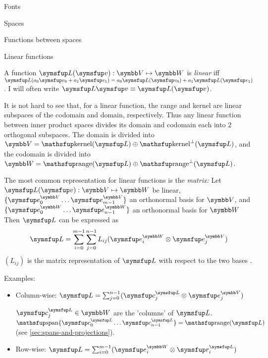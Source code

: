 \documentclass[12pt]{PalisadesLakesArticle}
\begin{document}
\begin{plSection}{Fonts}
\begin{plSection}{Spaces}
\begin{plSection}{Functions between spaces}
\begin{plSection}{Linear functions}
\label{sec:linear-functions}

A function $\Vector{L}(\Vector{v}):\Space{V} \mapsto \Space{W}$
is \textit{linear} iff
$\Vector{L}(a_0 \Vector{v}_0 + a_1 \Vector{v}_1) 
= a_0 \Vector{L}(\Vector{v}_0) + a_1 \Vector{L}(\Vector{v}_1)$.
I will often write
 $\Vector{L}\Vector{v} \equiv \Vector{L}(\Vector{v})$.

It is not hard to see that, for a linear function,
the range and kernel are linear subspaces of the codomain and
domain, respectively.
Thus any linear function between inner product spaces
divides its domain and codomain each into 2 orthogonal subspaces.
The domain is divided into 
$\Space{V} = \kernel(\Vector{L}) \oplus \kernel^{\perp}(\Vector{L})$,
and the codomain is divided into 
$\Space{W} = \range(\Vector{L}) \oplus \range^{\perp}(\Vector{L})$.

The most common representation for linear functions is the \textit{matrix:}
Let $\Vector{L}(\Vector{v}):\Space{V} \mapsto \Space{W}$ be linear,
$\{ \Vector{e}_0^{\Space{V}} \ldots  \Vector{e}_{m-1}^{\Space{V}} \}$ 
an orthonormal basis for $\Space{V}$,
and
$\{ \Vector{e}_0^{\Space{W}} \ldots \Vector{e}_{n-1}^{\Space{W}} \}$ 
an orthonormal  basis for $\Space{W}$
Then $\Vector{L}$ can be expressed as
\begin{equation}
\Vector{L}
 =
\sum_{i=0}^{m-1} \sum_{j=0}^{n-1} L_{ij}
 ( \Vector{e}_i^{\Space{W}} \otimes \Vector{e}_j^{\Space{V}} )
\end{equation}
$(L_{ij})$ is the matrix representation of $\Vector{L}$ with respect to
the two bases .

Examples:

\begin{itemize}

\item Column-wise:
$\Vector{L} = \sum_{j=0}^{n-1} 
( \Vector{c}_j^{\Vector{L}} \otimes \Vector{e}_j^{\Space{V}} )$

$\Vector{c}_j^{\Vector{L}} \in \Space{W}$ 
are the 'columns' of $\Vector{L}$.
$\linearspan\{ \Vector{c}_0^{\Vector{L}} 
\ldots \Vector{c}_{n-1}^{\Vector{L}} \} = \range(\Vector{L})$
(see \cref{sec:spans-and-projections}).

\item Row-wise:
$\Vector{L} = \sum_{i=0}^{m-1} ( \Vector{e}_i^{\Space{W}} \otimes  \Vector{r}_i^{\Vector{L}} )$


\end{itemize}
\end{plSection}
\end{plSection}
\end{plSection}
\end{plSection}
\end{document}
